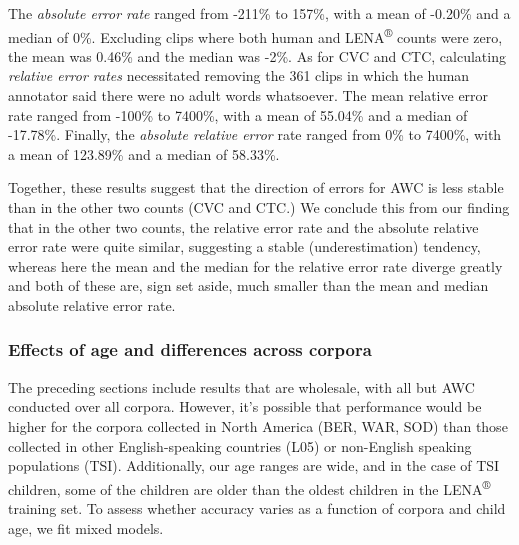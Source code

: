 \documentclass[english,table,man,floatsintext]{apa6}
\begin{document}
The \emph{absolute error rate} ranged from -211\% to 157\%, with a mean
of -0.20\% and a median of 0\%. Excluding clips where both human and
LENA\textsuperscript{®} counts were zero, the mean was 0.46\% and the
median was -2\%. As for CVC and CTC, calculating \emph{relative error
rates} necessitated removing the 361 clips in which the human annotator
said there were no adult words whatsoever. The mean relative error rate
ranged from -100\% to 7400\%, with a mean of 55.04\% and a median of
-17.78\%. Finally, the \emph{absolute relative error} rate ranged from
0\% to 7400\%, with a mean of 123.89\% and a median of 58.33\%.

Together, these results suggest that the direction of errors for AWC is
less stable than in the other two counts (CVC and CTC.) We conclude this
from our finding that in the other two counts, the relative error rate
and the absolute relative error rate were quite similar, suggesting a
stable (underestimation) tendency, whereas here the mean and the median
for the relative error rate diverge greatly and both of these are, sign
set aside, much smaller than the mean and median absolute relative error
rate.

\subsubsection{Effects of age and differences across
corpora}\label{effects-of-age-and-differences-across-corpora}

The preceding sections include results that are wholesale, with all but
AWC conducted over all corpora. However, it's possible that performance
would be higher for the corpora collected in North America (BER, WAR,
SOD) than those collected in other English-speaking countries (L05) or
non-English speaking populations (TSI). Additionally, our age ranges are
wide, and in the case of TSI children, some of the children are older
than the oldest children in the LENA\textsuperscript{®} training set. To
assess whether accuracy varies as a function of corpora and child age,
we fit mixed models.
\end{document}
